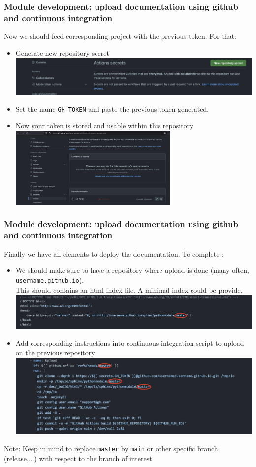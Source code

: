 \documentclass[8pt]{beamer}
\begin{document}
\begin{frame}
  \frametitle{Module development: upload documentation using github and continuous integration}
  Now we should feed corresponding project with the previous token. For that:

    \begin{itemize}
      \item Generate new repository secret
      \includegraphics[width=8.cm, height=2cm]{generate_new_rep.png}
      \item Set the name \texttt{GH\_TOKEN} and paste the previous token generated.
      \item Now your token is stored and usable within this repository
      \includegraphics[width=8.cm, height=4cm]{refer_token.png}
      \end{itemize}
\end{frame}

\begin{frame}
  \frametitle{Module development: upload documentation using github and continuous integration}
  Finally we have all elements to deploy the documentation. To complete :
    \begin{itemize} 
      \item We should make sure to have a repository where upload is done (many often, \texttt{username.github.io}).\\
       This should contains an html index file. A minimal index could be provide.
       \includegraphics[width=9.cm]{index_minimal.png}
      \item Add corresponding instructions into continuous-integration script to upload on the previous repository
      \includegraphics[width=5.cm]{instruction_ci.png}
    \end{itemize}
    Note: Keep in mind to replace \texttt{master} by \texttt{main} or other specific branch (release,...) with respect to the branch of interest.
\end{frame}
\end{document}
